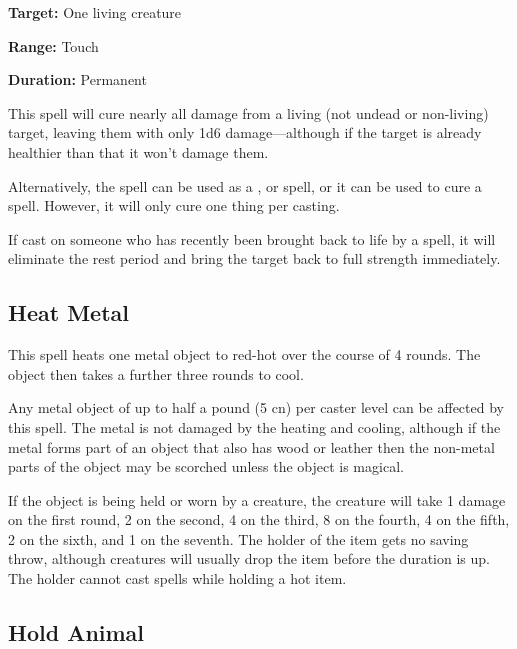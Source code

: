 \begin{multicols*}{2}
{\textbf{Target:} One living creature

\textbf{Range:} Touch

\textbf{Duration:} Permanent}

This spell will cure nearly all damage from a living (not undead or non-living) target, leaving them with only 1d6 damage—although if the target is already healthier than that it won’t damage them.

Alternatively, the spell can be used as a ,  or  spell, or it can be used to cure a  spell. However, it will only cure one thing per casting.

If cast on someone who has recently been brought back to life by a  spell, it will eliminate the rest period and bring the target back to full strength immediately.

\subsection{Heat Metal}\label{spell:Heat Metal}

This spell heats one metal object to red-hot over the course of 4 rounds. The object then takes a further three rounds to cool.

Any metal object of up to half a pound (5 cn) per caster level can be affected by this spell. The metal is not damaged by the heating and cooling, although if the metal forms part of an object that also has wood or leather then the non-metal parts of the object may be scorched unless the object is magical.

If the object is being held or worn by a creature, the creature will take 1 damage on the first round, 2 on the second, 4 on the third, 8 on the fourth, 4 on the fifth, 2 on the sixth, and 1 on the seventh. The holder of the item gets no saving throw, although creatures will usually drop the item before the duration is up. The holder cannot cast spells while holding a hot item.

\subsection{Hold Animal}\label{spell:Hold Animal}
\end{multicols*}
